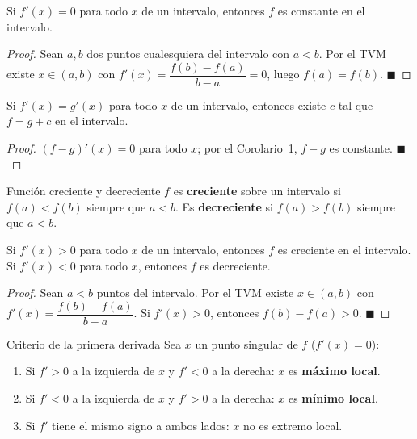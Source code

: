 \documentclass[12pt]{article}
\begin{document}
\begin{corolario}[1]{}
Si $f'(x) = 0$ para todo $x$ de un intervalo, entonces $f$ es constante en el intervalo.
\end{corolario}

\begin{proof}
Sean $a, b$ dos puntos cualesquiera del intervalo con $a < b$. Por el TVM existe $x \in (a,b)$ con $f'(x) = \dfrac{f(b)-f(a)}{b-a} = 0$, luego $f(a) = f(b)$.
$\blacksquare$
\end{proof}

\begin{corolario}[2]{}
Si $f'(x) = g'(x)$ para todo $x$ de un intervalo, entonces existe $c$ tal que $f = g + c$ en el intervalo.
\end{corolario}

\begin{proof}
$(f-g)'(x) = 0$ para todo $x$; por el Corolario~1, $f-g$ es constante.
$\blacksquare$
\end{proof}

\begin{definicion}[]{Función creciente y decreciente}
$f$ es \textbf{creciente} sobre un intervalo si $f(a) < f(b)$ siempre que $a < b$. Es \textbf{decreciente} si $f(a) > f(b)$ siempre que $a < b$.
\end{definicion}

\begin{corolario}[3]{}
Si $f'(x) > 0$ para todo $x$ de un intervalo, entonces $f$ es creciente en el intervalo. Si $f'(x) < 0$ para todo $x$, entonces $f$ es decreciente.
\end{corolario}

\begin{proof}
Sean $a < b$ puntos del intervalo. Por el TVM existe $x \in (a,b)$ con $f'(x) = \dfrac{f(b)-f(a)}{b-a}$. Si $f'(x)>0$, entonces $f(b)-f(a)>0$.
$\blacksquare$
\end{proof}

\begin{nota}[]{Criterio de la primera derivada}
Sea $x$ un punto singular de $f$ ($f'(x)=0$):
\begin{enumerate}
  \item Si $f'>0$ a la izquierda de $x$ y $f'<0$ a la derecha: $x$ es \textbf{máximo local}.
  \item Si $f'<0$ a la izquierda de $x$ y $f'>0$ a la derecha: $x$ es \textbf{mínimo local}.
  \item Si $f'$ tiene el mismo signo a ambos lados: $x$ no es extremo local.
\end{enumerate}
\end{nota}
\end{document}
